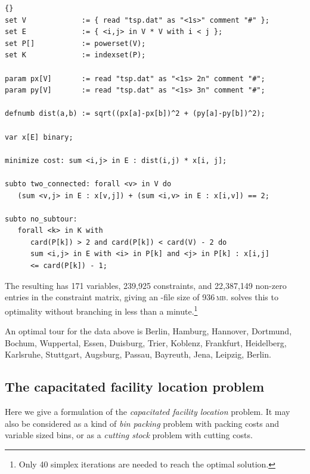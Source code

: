 \medskip
{}
\begin{lstlisting}[frame=tb]{}
set V             := { read "tsp.dat" as "<1s>" comment "#" };
set E             := { <i,j> in V * V with i < j };
set P[]           := powerset(V);
set K             := indexset(P);

param px[V]       := read "tsp.dat" as "<1s> 2n" comment "#";
param py[V]       := read "tsp.dat" as "<1s> 3n" comment "#";

defnumb dist(a,b) := sqrt((px[a]-px[b])^2 + (py[a]-py[b])^2);

var x[E] binary;

minimize cost: sum <i,j> in E : dist(i,j) * x[i, j];

subto two_connected: forall <v> in V do
   (sum <v,j> in E : x[v,j]) + (sum <i,v> in E : x[i,v]) == 2;

subto no_subtour:
   forall <k> in K with
      card(P[k]) > 2 and card(P[k]) < card(V) - 2 do
      sum <i,j> in E with <i> in P[k] and <j> in P[k] : x[i,j]
      <= card(P[k]) - 1;
\end{lstlisting}

\medskip
\noindent The resulting \lp has 171 variables, 239,925 constraints, and
22,387,149 non-zero entries in the constraint matrix, giving an \mps-file
size of 936\,\textsc{mb}. \cplex solves this to optimality
without branching in less than a minute.\footnote{Only 40
simplex iterations are needed to reach the optimal solution.}

An optimal tour for the data above is
Berlin, Hamburg, Hannover, Dortmund, Bo\-chum, Wuppertal, Essen,
Duisburg, Trier, Koblenz, Frankfurt, Heidelberg, Karlsruhe, Stuttgart,
Augsburg, Passau, Bayreuth, Jena, Leipzig, Berlin.


\subsection{The capacitated facility location problem}
Here we give a formulation of the \emph{capacitated facility
location} problem. It may also be considered as a kind of \emph{bin packing} problem
with packing costs and variable sized bins, or as a \emph{cutting stock} problem
with cutting costs.

